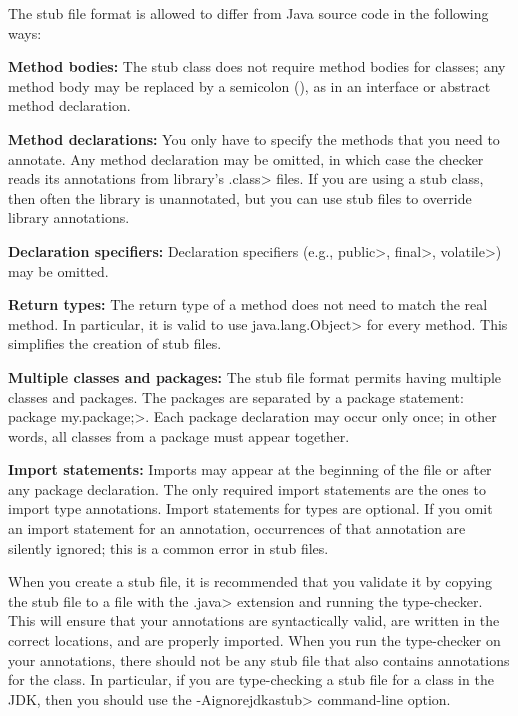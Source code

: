The stub file format is allowed to differ from Java source code in the
following ways:
\begin{description}

\item{\textbf{Method bodies:}}
  The stub class does not require method bodies for classes; any method
  body may be replaced by a semicolon (\code{;}), as in an interface or
  abstract method declaration.

\item{\textbf{Method declarations:}}
  You only have to specify the methods that you need to annotate.
  Any method declaration may be omitted, in which case the checker reads
  its annotations from library's \<.class> files.  If you are using a stub class, then
  often the library is unannotated, but you can use stub files to override
  library annotations.

\item{\textbf{Declaration specifiers:}}
  Declaration specifiers (e.g., \<public>, \<final>, \<volatile>)
  may be omitted.

\item{\textbf{Return types:}}
  The return type of a method does not need to match the real method.
  In particular, it is valid to use \<java.lang.Object> for every method.
  This simplifies the creation of stub files.

\item{\textbf{Multiple classes and packages:}}
  The stub file format permits having multiple classes and packages.
  The packages are separated by a package statement:
  \<package my.package;>.  Each package declaration may occur only once; in
  other words, all classes from a package must appear together.

\item{\textbf{Import statements:}}
  Imports may appear at the beginning of the file or after any package declaration.
  The only required import statements are the ones to import type
  annotations.  Import statements for types are optional.  If you omit an
  import statement for an annotation, occurrences of that annotation are
  silently ignored; this is a common error in stub files.

\end{description}

When you create a stub file, it is recommended that you validate it by copying
the stub file to a file with the \<.java> extension and running the
type-checker.  This will ensure that your annotations are syntactically
valid, are written in the correct locations, and are properly imported.
When you run the type-checker on your annotations, there should not be any
stub file that also contains annotations for the class.  In particular, if
you are type-checking a stub file for a class in the JDK, then you should
use the \<-Aignorejdkastub> command-line option.


